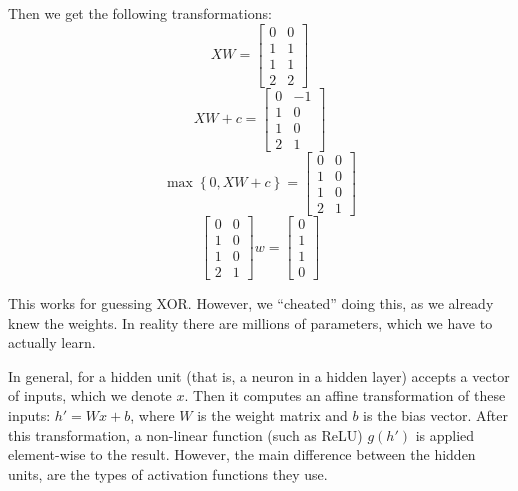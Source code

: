 Then we get the following transformations:
\begin{equation}
	XW = \begin{bmatrix}
		0 & 0 \\
		1 & 1 \\
		1 & 1 \\
		2 & 2
	\end{bmatrix}
\end{equation}
\begin{equation}
	XW + c = \begin{bmatrix}
		0 & -1 \\
		1 & 0  \\
		1 & 0  \\
		2 & 1
	\end{bmatrix}
\end{equation}
\begin{equation}
	\max \left\{ 0,XW+c \right\} = \begin{bmatrix}
		0 & 0 \\
		1 & 0 \\
		1 & 0 \\
		2 & 1
	\end{bmatrix}
\end{equation}
\begin{equation}
	\begin{bmatrix}
		0 & 0 \\
		1 & 0 \\
		1 & 0 \\
		2 & 1
	\end{bmatrix}w = \begin{bmatrix}
		0 \\
		1 \\
		1 \\
		0
	\end{bmatrix}
\end{equation}

This works for guessing XOR. However, we ``cheated'' doing this, as we already knew the weights. In reality there are millions of parameters, which we have to actually learn.

In general, for a hidden unit (that is, a neuron in a hidden layer) accepts a vector of inputs, which we denote $x$. Then it computes an affine transformation of these inputs: $h' = Wx+b$, where $W$ is the weight matrix and $b$ is the bias vector. After this transformation, a non-linear function (such as ReLU) $g(h')$ is applied element-wise to the result. However, the main difference between the hidden units, are the types of activation functions they use.

